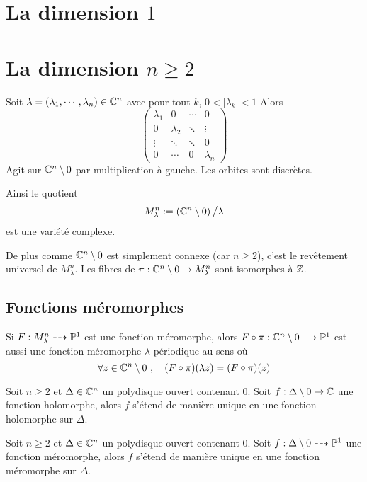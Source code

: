 \documentclass[a4paper]{article}
\begin{document}
\section{La dimension $1$}
\section{La dimension $n \geq 2$}
Soit $\lambda = (\lambda_1,\cdots, \lambda_n) \in \mathbb{C}^n$ avec pour tout $k$, $0<|\lambda_k|<1$
Alors
\begin{equation}
\left(
\begin{array}{cccc}
\lambda_1 & 0 & \cdots & 0 \\ 
0 & \lambda_2 & \ddots  & \vdots \\ 
\vdots & \ddots & \ddots & 0 \\ 
0 & \cdots & 0 & \lambda_n
\end{array} 
\right)
\end{equation}
Agit sur $\mathbb{C}^n \setminus 0$ par multiplication à gauche. Les orbites sont discrètes.

Ainsi le quotient
\begin{equation}
M_\lambda^n := \left(\mathbb{C}^n \setminus 0\right) \big/ \lambda
\end{equation}
est une variété complexe.

De plus comme $\mathbb{C}^n \setminus 0$ est simplement connexe (car $n \geq 2$), c'est le revêtement universel de $M_\lambda^n$. Les fibres de $\pi : \mathbb{C}^n \setminus 0 \to M_\lambda^n$ sont isomorphes à $\mathbb{Z}$.

\subsection{Fonctions méromorphes}
Si $F : M_\lambda^n \dashrightarrow \mathbb{P}^1$ est une fonction méromorphe, alors $F\circ \pi : \mathbb{C}^n \setminus 0 \dashrightarrow \mathbb{P}^1$ est aussi une fonction méromorphe $\lambda$-périodique au sens où
\begin{equation}
\forall z \in \C^n \setminus 0\ ,\quad (F\circ \pi)(\lambda z) = (F\circ \pi)(z)
\end{equation}

\begin{thm}
Soit $n \geq 2$ et $\Delta \in \mathbb{C}^n$ un polydisque ouvert contenant $0$. Soit $f : \Delta \setminus 0 \to \mathbb{C}$ une fonction holomorphe, alors $f$ s'étend de manière unique en une fonction holomorphe sur $\Delta$.
\end{thm}
\begin{thm}
Soit $n \geq 2$ et $\Delta \in \mathbb{C}^n$ un polydisque ouvert contenant $0$. Soit $f : \Delta \setminus 0 \dashrightarrow \mathbb{P}^1$ une fonction méromorphe, alors $f$ s'étend de manière unique en une fonction méromorphe sur $\Delta$.
\end{thm}
\end{document}
